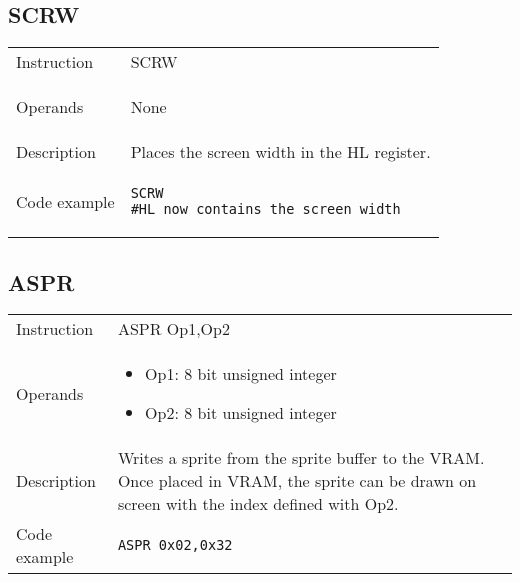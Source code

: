 \subsection{SCRW}
\renewcommand*{\arraystretch}{2.0}
\begin{longtable}{P{3cm}P{9cm}}
\midrule
\noindent Instruction & SCRW \\
\noindent Operands &
\begin{itemize}[label={},noitemsep,leftmargin=*,topsep=0pt,partopsep=0pt, itemsep=1em]None\end{itemize}\\
\noindent Description & Places the screen width in the HL register. \\
\noindent Code example & 
\begin{lstlisting}
SCRW
#HL now contains the screen width
\end{lstlisting} \\
\end{longtable}

\newpage

\subsection{ASPR}
\renewcommand*{\arraystretch}{2.0}
\begin{longtable}{P{3cm}P{9cm}}
\midrule
\noindent Instruction & ASPR Op1,Op2 \\
\noindent Operands &
\begin{itemize}[label={},noitemsep,leftmargin=*,topsep=0pt,partopsep=0pt, itemsep=1em]
\item Op1: 8 bit unsigned integer

\item Op2: 8 bit unsigned integer
\end{itemize}\\
\noindent Description & Writes a sprite from the sprite buffer to the VRAM. Once placed in VRAM, the sprite can be drawn on screen with the index defined with Op2. \\
\noindent Code example & 
\begin{lstlisting}
ASPR 0x02,0x32
\end{lstlisting} \\
\end{longtable}


